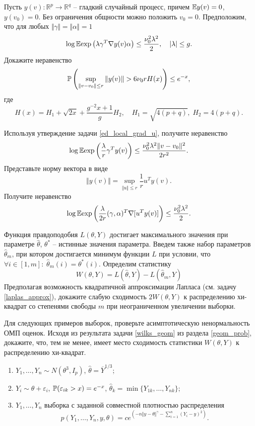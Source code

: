 \begin{problem}
Пусть $y(v): \mathbb{R}^p \to \mathbb{R}^q$ -- гладкий случайный процесс, причем $\mathrm{{\mathbb E}} y(v) = 0$, $y(v_0) = 0$. Без ограничения общности можно положить $v_0 = 0$. Предположим, что для любых $\Vert \gamma \Vert = \Vert \alpha \Vert = 1$
\[
\log \mathrm{{\mathbb E}} \text{exp}\left( \lambda \gamma^T \nabla y (v) \alpha \right) \leq \frac{\nu_0^2 \lambda^2}{2},
\quad |\lambda| \leq g.
\] 
Докажите неравенство
\[
\mathrm{{\mathbb P}} \left(\sup_{\Vert v - v_0 \Vert \leq r} \Vert y(v) \Vert  > 6 \nu_0 r H(x) \right) \leq e^{-x},
\]
где
\[
H(x) = H_1 + \sqrt{2x} + \frac{g^{-2} x + 1}{g} H_2, 
\quad H_1 = \sqrt{4(p + q)}, \; H_2 = 4(p + q). 
\]
\end{problem}

\begin{ordre}
Используя утверждение задачи \ref{ed_local_grad_u}, получите неравенство
\[
\log \mathrm{{\mathbb E}} \text{exp}\left( \frac{\lambda}{r} \gamma^T y (v)  \right) \leq \frac{\nu_0^2 \lambda^2 \Vert v - v_0 \Vert^2}{2r^2}.
\]
Представьте норму вектора в виде
\[
\Vert y(v) \Vert = \sup_{\Vert u \Vert \leq r } \frac{1}{r} u^T y(v). 
\]
Получите неравенство
\[
\log \mathrm{{\mathbb E}} \text{exp}\left( \frac{\lambda}{2r} (\gamma,\alpha)^T \nabla [u^T y (v)] \right) \leq \frac{\nu_0^2 \lambda^2}{2}.
\] 
\end{ordre}

\begin{problem}
Функция правдоподобия $L(\theta, Y)$ достигает максимального  значения  при параметре $\widehat{\theta}$, $\theta^*$ -- истинные значения параметра. Введем также набор параметров $\widehat{\theta}_m$, при котором достигается минимум функции $L$ при условии, что $\forall i \in [1,m]: \; \widehat{\theta}_m(i) = \theta^*(i)$. Определим статистику 
\[
W(\theta, Y) = L(\widehat{\theta}, Y) -  L(\widehat{\theta}_m, Y) 
\]
Предполагая возможность квадратичной аппроксимации Лапласа (см. задачу \ref{laplas_approx}), докажите слабую сходимость $2W(\theta, Y)$ к распределению хи-квадрат со степенями свободы $m$ при неограниченном увеличении выборки. 
 
\end{problem}

\begin{problem}
Для следующих примеров выборок, проверьте асимптотическую ненормальность ОМП оценок. Исходя из результата задачи \ref{wilks_geom} из раздела \ref{geom_prob}, докажите, что, тем не менее, имеет место сходимость статистики $W(\theta, Y)$   к распределению хи-квадрат.
\begin{enumerate}
\item $Y_1,\ldots,Y_n \sim N(\theta^3, I_p)$, $\widehat{\theta} = \overline{Y}^{1/3}$;
\item $Y_i \sim \theta + \varepsilon_i$, $\mathrm{{\mathbb P}}(\varepsilon_{ik} > x) = e^{-x} $, $\widehat{\theta}_k = \min \{Y_{1k},\ldots,Y_{nk} \}$;
\item $Y_1,\ldots,Y_n$ выборка с заданной совместной плотностью распределения 
\[
p(Y_1,\ldots,Y_n, y, \theta) = c e^{\left(-n \Vert y - \theta \Vert^{\gamma} - \sum_{i=1}^{n} (Y_i - y)^2 \right)}.
\]
\end{enumerate}
 
\end{problem}

